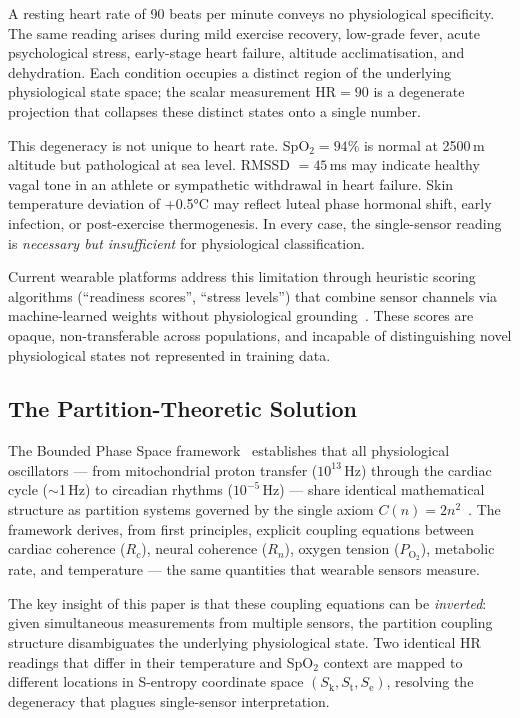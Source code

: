 \documentclass[10pt,twocolumn,a4paper]{article}
\theoremstyle{definition}
\newcommand{\SE}{S_{\text{e}}}
\newcommand{\SK}{S_{\text{k}}}
\newcommand{\ST}{S_{\text{t}}}
\newcommand{\Rc}{R_c}
\newcommand{\Rn}{R_n}
\begin{document}
A resting heart rate of 90 beats per minute conveys no physiological
specificity. The same reading arises during mild exercise recovery,
low-grade fever, acute psychological stress, early-stage heart failure,
altitude acclimatisation, and dehydration. Each condition occupies a
distinct region of the underlying physiological state space; the scalar
measurement $\text{HR} = 90$ is a degenerate projection that collapses
these distinct states onto a single number.

This degeneracy is not unique to heart rate. SpO$_2 = 94\%$ is normal
at 2500\,m altitude but pathological at sea level. RMSSD $= 45$\,ms
may indicate healthy vagal tone in an athlete or sympathetic withdrawal
in heart failure. Skin temperature deviation of +0.5°C may
reflect luteal phase hormonal shift, early infection, or post-exercise
thermogenesis. In every case, the single-sensor reading is
\emph{necessary but insufficient} for physiological classification.

Current wearable platforms address this limitation through heuristic
scoring algorithms (``readiness scores'', ``stress levels'') that
combine sensor channels via machine-learned weights without
physiological grounding~\cite{altini2021promise,derosario2019validity}.
These scores are opaque, non-transferable across populations, and
incapable of distinguishing novel physiological states not represented
in training data.

\subsection{The Partition-Theoretic Solution}

The Bounded Phase Space framework~\cite{sachikonye2024integration}
establishes that all physiological oscillators --- from mitochondrial
proton transfer ($10^{13}$\,Hz) through the cardiac cycle ($\sim$1\,Hz)
to circadian rhythms ($10^{-5}$\,Hz) --- share identical mathematical
structure as partition systems governed by the single axiom
$C(n) = 2n^2$~\cite{sachikonye2024fluid,sachikonye2024gas}. The
framework derives, from first principles, explicit coupling equations
between cardiac coherence ($\Rc$), neural coherence ($\Rn$), oxygen
tension ($P_{\text{O}_2}$), metabolic rate, and temperature --- the
same quantities that wearable sensors measure.

The key insight of this paper is that these coupling equations can be
\emph{inverted}: given simultaneous measurements from multiple sensors,
the partition coupling structure disambiguates the underlying
physiological state. Two identical HR readings that differ in their
temperature and SpO$_2$ context are mapped to different locations in
S-entropy coordinate space $(\SK, \ST, \SE)$, resolving the degeneracy
that plagues single-sensor interpretation.
\end{document}
